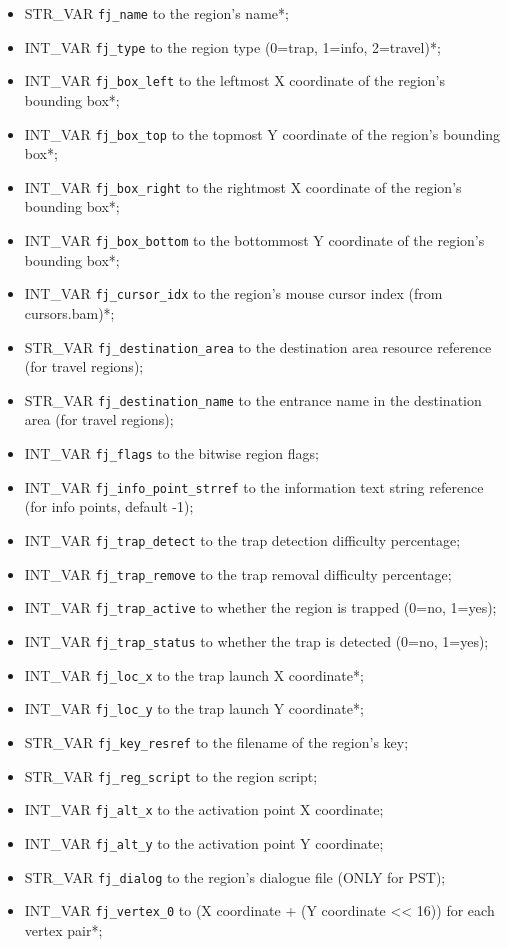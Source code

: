 \documentclass{article}
\begin{document}
\begin{itemize}
\item STR_VAR \verb+fj_name+ to the region's name*;
\item INT_VAR \verb+fj_type+ to the region type (0=trap, 1=info, 2=travel)*;
\item INT_VAR \verb+fj_box_left+ to the leftmost X coordinate of the region's bounding box*;
\item INT_VAR \verb+fj_box_top+ to the topmost Y coordinate of the region's bounding box*;
\item INT_VAR \verb+fj_box_right+ to the rightmost X coordinate of the region's bounding box*;
\item INT_VAR \verb+fj_box_bottom+ to the bottommost Y coordinate of the region's bounding box*;
\item INT_VAR \verb+fj_cursor_idx+ to the region's mouse cursor index (from cursors.bam)*;
\item STR_VAR \verb+fj_destination_area+ to the destination area resource reference (for travel regions);
\item STR_VAR \verb+fj_destination_name+ to the entrance name in the destination area (for travel regions);
\item INT_VAR \verb+fj_flags+ to the bitwise region flags;
\item INT_VAR \verb+fj_info_point_strref+ to the information text string reference (for info points, default -1);
\item INT_VAR \verb+fj_trap_detect+ to the trap detection difficulty percentage;
\item INT_VAR \verb+fj_trap_remove+ to the trap removal difficulty percentage;
\item INT_VAR \verb+fj_trap_active+ to whether the region is trapped (0=no, 1=yes);
\item INT_VAR \verb+fj_trap_status+ to whether the trap is detected (0=no, 1=yes);
\item INT_VAR \verb+fj_loc_x+ to the trap launch X coordinate*;
\item INT_VAR \verb+fj_loc_y+ to the trap launch Y coordinate*;
\item STR_VAR \verb+fj_key_resref+ to the filename of the region's key;
\item STR_VAR \verb+fj_reg_script+ to the region script;
\item INT_VAR \verb+fj_alt_x+ to the activation point X coordinate;
\item INT_VAR \verb+fj_alt_y+ to the activation point Y coordinate;
\item STR_VAR \verb+fj_dialog+ to the region's dialogue file (ONLY for PST);
\item INT_VAR \verb+fj_vertex_0+ to (X coordinate + (Y coordinate << 16)) for each vertex pair*;
\end{itemize}
\end{document}
